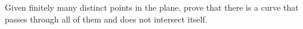 Given finitely many distinct points in the plane, prove that there is a curve that passes through all of them and does not intersect itself.
